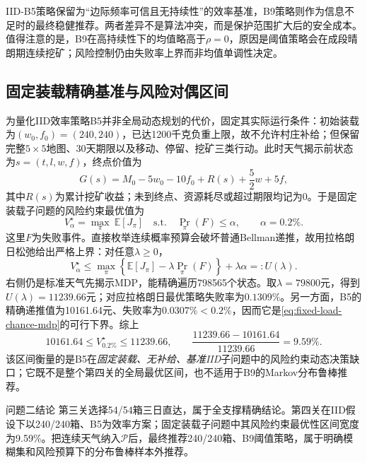 IID-B5策略保留为“边际频率可信且无持续性”的效率基准，B9策略则作为信息不足时的最终稳健推荐。两者差异不是算法冲突，而是保护范围扩大后的安全成本。值得注意的是，B9在高持续性下的均值略高于$\rho=0$，原因是阈值策略会在成段晴朗期连续挖矿；风险控制仍由失败率上界而非均值单调性决定。

\subsection{固定装载精确基准与风险对偶区间}

为量化IID效率策略B5并非全局动态规划的代价，固定其实际运行条件：初始装载为$(w_0,f_0)=(240,240)$，已达1200千克负重上限，故不允许村庄补给；但保留完整$5\times5$地图、30天期限以及移动、停留、挖矿三类行动。此时天气揭示前状态为$s=(t,l,w,f)$，终点价值为
\begin{equation}
G(s)=M_0-5w_0-10f_0+R(s)+\frac52w+5f,
\label{eq:fixed-load-terminal}
\end{equation}
其中$R(s)$为累计挖矿收益；未到终点、资源耗尽或超过期限均记为0。于是固定装载子问题的风险约束最优值为
\begin{equation}
V^\star_\alpha=\max_{\pi}\ \mathbb E[J_\pi]
\quad\text{s.t.}\quad \Pr_\pi(F)\le\alpha,
\qquad \alpha=0.2\%.
\label{eq:fixed-load-chance-mdp}
\end{equation}
这里$F$为失败事件。直接枚举连续概率预算会破坏普通Bellman递推，故用拉格朗日松弛给出严格上界：对任意$\lambda\ge0$，
\begin{equation}
V^\star_\alpha\le
\max_\pi\left\{\mathbb E[J_\pi]-\lambda\Pr_\pi(F)\right\}
+\lambda\alpha=:U(\lambda).
\label{eq:fixed-load-dual}
\end{equation}
右侧仍是标准天气先揭示MDP，能精确遍历798565个状态。取$\lambda=79800$元，得到$U(\lambda)=11239.66$元；对应拉格朗日最优策略失败率为$0.1309\%$。另一方面，B5的精确递推值为10161.64元、失败率为$0.0307\%<0.2\%$，因而它是\cref{eq:fixed-load-chance-mdp}的可行下界。综上
\begin{equation}
10161.64\le V^\star_{0.2\%}\le11239.66,
\qquad \frac{11239.66-10161.64}{11239.66}=9.59\%.
\label{eq:fixed-load-certified-gap}
\end{equation}
该区间衡量的是B5在\emph{固定装载、无补给、基准IID}子问题中的风险约束动态决策缺口；它既不是整个第四关的全局最优区间，也不适用于B9的Markov分布鲁棒推荐。

\begin{resultbox}{问题二结论}
第三关选择54/54箱三日直达，属于全支撑精确结论。第四关在IID假设下以240/240箱、B5为效率方案；固定装载子问题中其风险约束最优性区间宽度为9.59\%。把连续天气纳入$\mathcal P$后，最终推荐240/240箱、B9阈值策略，属于明确模糊集和风险预算下的分布鲁棒样本外推荐。
\end{resultbox}
